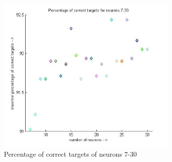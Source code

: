 \documentclass{scrartcl}
\begin{document}
 \begin{figure}[p]
    \centering
    \includegraphics[width=0.8\textwidth]{Plot_Correct_Targets.jpg}
    \caption{Percentage of correct targets of neurons 7-30}
    \label{fig:figure_2}
\end{figure}

\pagebreak
\end{document}
